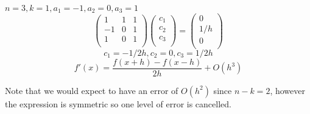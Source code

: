 \documentclass[a4paper,10pt]{article}
\begin{document}
\begin{ex}
	$n=3, k=1, a_1=-1, a_2=0, a_3=1$
	\[
		\begin{pmatrix}
			1 & 1 & 1 \\
			-1 & 0 & 1 \\
			1 & 0 & 1 \\
		\end{pmatrix}
		\begin{pmatrix}
			c_1 \\
			c_2 \\
			c_3 \\
		\end{pmatrix}
		=
		\begin{pmatrix}
			0 \\
			1/h \\
			0 \\
		\end{pmatrix}
	\]
	\[ c_1 = -1/2h, c_2 = 0, c_3 = 1/2h \]
	\[ f'(x) = \frac{f(x+h) - f(x-h)}{2h} + O(h^3) \]

	Note that we would expect to have an error of $O(h^2)$ since
	$n-k=2$, however the expression is symmetric so one level of
	error is cancelled.
\end{ex}
\end{document}
